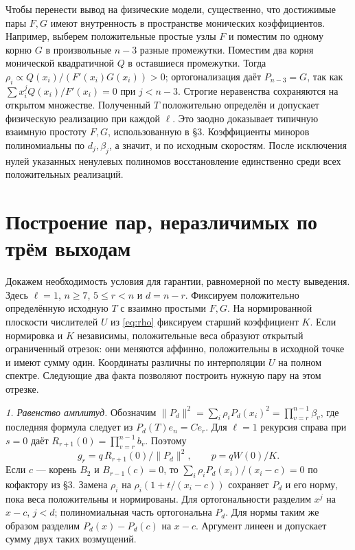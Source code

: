 \documentclass[11pt,a4paper]{article}
\begin{document}
Чтобы перенести вывод на физические модели, существенно, что достижимые пары \(F,G\) имеют внутренность в пространстве монических коэффициентов. Например, выберем положительные простые узлы \(F\) и поместим по одному корню \(G\) в произвольные \(n-3\) разные промежутки. Поместим два корня монической квадратичной \(Q\) в оставшиеся промежутки. Тогда \(\rho_i\propto Q(x_i)/(F'(x_i)G(x_i))>0\); ортогонализация даёт \(P_{n-3}=G\), так как \(\sum x_i^jQ(x_i)/F'(x_i)=0\) при \(j<n-3\). Строгие неравенства сохраняются на открытом множестве. Полученный \(T\) положительно определён и допускает физическую реализацию при каждой \(\ell\). Это заодно доказывает типичную взаимную простоту \(F,G\), использованную в §3. Коэффициенты миноров полиномиальны по \(d_j,\beta_j\), а значит, и по исходным скоростям. После исключения нулей указанных ненулевых полиномов восстановление единственно среди всех положительных реализаций.

\newpage
\section{Построение пар, неразличимых по трём выходам}
Докажем необходимость условия для гарантии, равномерной по месту выведения. Здесь \(\ell=1\), \(n\ge7\), \(5\le r<n\) и \(d=n-r\). Фиксируем положительно определённую исходную \(T\) с взаимно простыми \(F,G\). На нормированной плоскости числителей \(U\) из \eqref{eq:rho} фиксируем старший коэффициент \(K\). Если нормировка и \(K\) независимы, положительные веса образуют открытый ограниченный отрезок: они меняются аффинно, положительны в исходной точке и имеют сумму один. Координаты различны по интерполяции \(U\) на полном спектре. Следующие два факта позволяют построить нужную пару на этом отрезке.

\smallskip\noindent\textit{1. Равенство амплитуд.}
Обозначим \(\|P_d\|^2=\sum_i\rho_iP_d(x_i)^2=\prod_{v=r}^{n-1}\beta_v\), где последняя формула следует из \(P_d(T)e_n=C e_r\). Для \(\ell=1\) рекурсия справа при \(s=0\) даёт \(R_{r+1}(0)=\prod_{v=r}^{n-1}b_v\). Поэтому
\[
    g_r=q\,R_{r+1}(0)/\|P_d\|^2,\qquad p=qW(0)/K.
\]
Если \(c\) --- корень \(B_2\) и \(B_{r-1}(c)=0\), то \(\sum_i\rho_iP_d(x_i)/(x_i-c)=0\) по кофактору из §3. Замена \(\rho_i\) на \(\rho_i(1+t/(x_i-c))\) сохраняет \(P_d\) и его норму, пока веса положительны и нормированы. Для ортогональности разделим \(x^j\) на \(x-c\), \(j<d\); полиномиальная часть ортогональна \(P_d\). Для нормы таким же образом разделим \(P_d(x)-P_d(c)\) на \(x-c\). Аргумент линеен и допускает сумму двух таких возмущений.
\end{document}
